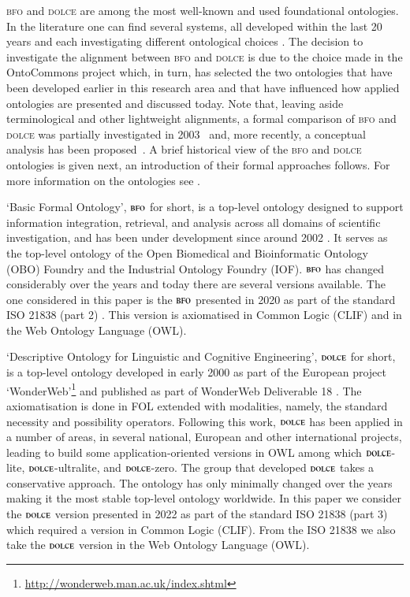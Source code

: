 \documentclass[ao]{iosart2x}
\newcommand{\nb}[1]{\textcolor{red}{$|$}\marginpar{\hspace*{-0cm}\parbox{20mm}{\scriptsize\raggedright\textcolor{red}{#1}}}}
\newcommand{\dolce}{{\textsc{dolce}}}
\newcommand{\bfo}{{\textsc{bfo}}}
\begin{document}
{\bfo} and {\dolce} are among the most well-known and used foundational ontologies. In the literature one can find several systems, all developed within the last 20 years and each investigating different ontological choices \citep{Borgo-GK2022FOinAction}. %
The decision to investigate the alignment between {\bfo} and {\dolce} is due to the choice made in the OntoCommons project which, in turn, has selected the two ontologies that have been developed earlier in this research area and that have influenced how applied ontologies are presented and discussed today. Note that, leaving aside terminological and other lightweight alignments, a formal comparison of {\bfo} and {\dolce} was partially investigated in 2003~\citep{D18} and, more recently, a conceptual analysis has been proposed~\citep{Guarino-2017BfoDolce}. %
A brief historical view of the {\bfo} and {\dolce} ontologies is given next, an introduction of their formal approaches follows. For more information on the ontologies see \citep{ISO21838, Borgo-GK2022FOinAction}.


`Basic Formal Ontology', $\bfo$ for short, is a top-level ontology designed to support information integration, retrieval, and analysis across all domains of scientific investigation, and has been under development since around 2002  \citep{grenonBiodynamic2004}. %
It serves as the top-level ontology of the Open Biomedical and Bioinformatic Ontology (OBO) Foundry and the Industrial Ontology Foundry (IOF). $\bfo$ has changed considerably over the years and today there are several versions available.
The one considered in this paper is the $\bfo$ presented in 2020 as part of the standard ISO 21838 (part 2) \citep{ISO21838}. This version is axiomatised in Common Logic (CLIF) \citep{ISO24707} and in the Web Ontology Language (OWL).


`Descriptive Ontology for Linguistic and Cognitive Engineering', $\dolce$ for short, is a top-level ontology developed in early 2000 as part of the European project `WonderWeb'\footnote{\url{http://wonderweb.man.ac.uk/index.shtml}} and published as part of WonderWeb Deliverable 18 \citep{D18}. The axiomatisation is done in FOL extended with modalities, namely, the standard necessity and possibility operators. Following this work, $\dolce$ has been applied in a number of areas, in several national, European and other international projects, leading to build some application-oriented versions in OWL among which $\dolce$-lite, $\dolce$-ultralite, and $\dolce$-zero. 
The group that developed $\dolce$ takes a conservative approach. The ontology has only minimally changed over the years making it the most stable top-level ontology worldwide. In this paper we consider the $\dolce$ version presented in 2022 as part of the standard ISO 21838 (part 3) which required a version in Common Logic (CLIF). 
From the ISO 21838 we also take the $\dolce$ version in the Web Ontology Language (OWL).
\end{document}
